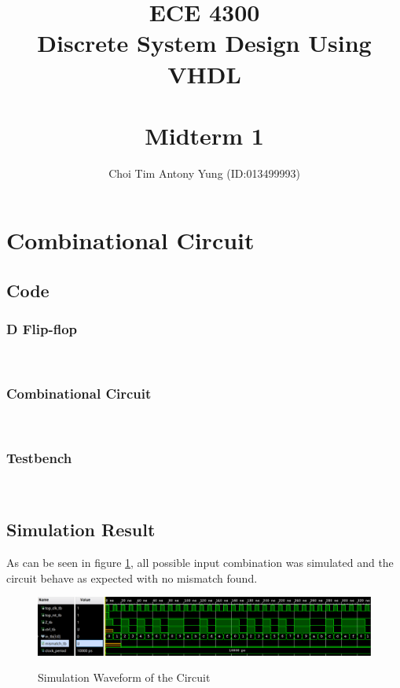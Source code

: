 \documentclass{article}
\title{ECE 4300\\Discrete System Design Using VHDL\\\,\\Midterm 1}
\author{Choi Tim Antony Yung (ID:013499993)}
\begin{document}
 \maketitle

 \newpage


\section{Combinational Circuit}

\subsection*{Code}
\subsubsection*{D Flip-flop}

\;\\
\subsubsection*{Combinational Circuit}

\;\\
\subsubsection*{Testbench}

\;\\
\subsection*{Simulation Result}
As can be seen in figure \ref{fig:1}, all possible input combination was simulated and the circuit behave as expected with no mismatch found.
\begin{figure}[H]
  \centering
  \caption{Simulation Waveform of the Circuit}
  \includegraphics[width=\textwidth]{ECE4304_Midterm1_1_sim.png}
  \label{fig:1}
\end{figure}
\end{document}

